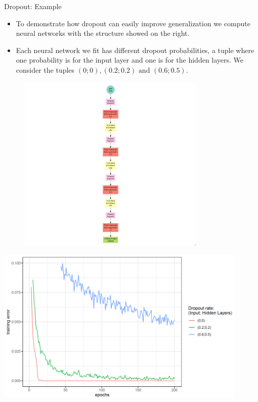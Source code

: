 \begin{vbframe}{Dropout: Example}
\begin{minipage}{0.5\textwidth}
\begin{itemize}
\item To demonstrate how dropout can easily improve generalization we compute neural networks with the structure showed on the right.
\item Each neural network we fit has different dropout probabilities, a tuple where one probability is for the input layer and one is for the hidden layers. We consider the tuples $(0;0) , (0.2;0.2) \text{ and } (0.6;0.5)$.
\end{itemize}
\end{minipage}
\begin{minipage}{0.45\textwidth}
\begin{figure}
\centering
\vspace{-0.5cm}
\includegraphics[width=9cm]{plots/mxnet_graph_dropout.png}
\end{figure}
\end{minipage}
\framebreak

\begin{center}
\includegraphics[width=0.9\textwidth]{plots/dropout01.png}
\end{center}


\end{vbframe}
